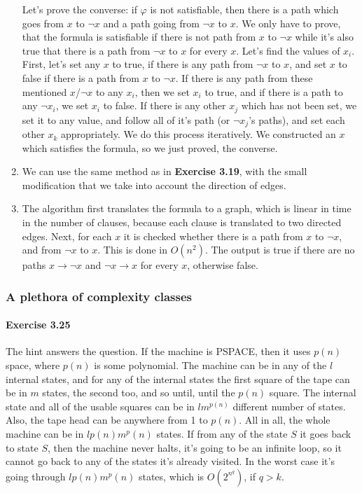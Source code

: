 \documentclass[a4paper,12pt]{article}
\newcommand{\exercise}[1]{\paragraph{Exercise #1}}
\begin{document}
\begin{enumerate}[label=(\arabic*)]
            Let's prove the converse: if $\varphi$ is not satisfiable, then there is a path which goes from $x$ to $\neg x$ and a path going from $\neg x$ to $x$. We only have to prove, that the formula is satisfiable if there is not path from $x$ to $\neg x$ while it's also true that there is a path from $\neg x$ to $x$ for every $x$. Let's find the values of $x_i$. First, let's set any $x$ to true, if there is any path from $\neg x$ to $x$, and set $x$ to false if there is a path from $x$ to $\neg x$. If there is any path from these mentioned $x$/$\neg x$ to any $x_i$, then we set $x_i$ to true, and if there is a path to any $\neg x_i$, we set $x_i$ to false. If there is any other $x_j$ which has not been set, we set it to any value, and follow all of it's path (or $\neg x_j$'s paths), and set each other $x_k$ appropriately. We do this process iteratively. We constructed an $x$ which satisfies the formula, so we just proved, the converse.

        \item We can use the same method as in \textbf{Exercise 3.19}, with the small modification that we take into account the direction of edges.

        \item The algorithm first translates the formula to a graph, which is linear in time in the number of clauses, because each clause is translated to two directed edges. Next, for each $x$ it is checked whether there is a path from $x$ to $\neg x$, and from $\neg x$ to $x$. This is done in $O(n^2)$. The output is true if there are no paths $x \rightarrow \neg x$ and $\neg x \rightarrow x$ for every $x$, otherwise false.

    \end{enumerate}

    \subsubsection{A plethora of complexity classes}

    \exercise{3.25} The hint answers the question. If the machine is \textrm{PSPACE}, then it uses $p(n)$ space, where $p(n)$ is some polynomial. The machine can be in any of the $l$ internal states, and for any of the internal states the first square of the tape can be in $m$ states, the second too, and so until, until the $p(n)$ square. The internal state and all of the usable squares can be in $l m^{p(n)}$ different number of states. Also, the tape head can be anywhere from 1 to $p(n)$. All in all, the whole machine can be in $l p(n) m^p(n)$ states. If from any of the state $S$ it goes back to state $S$, then the machine never halts, it's going to be an infinite loop, so it cannot go back to any of the states it's already visited. In the worst case it's going through $l p(n) m^p(n)$ states, which is $O(2^{n^q})$, if $q > k$.
\end{document}
